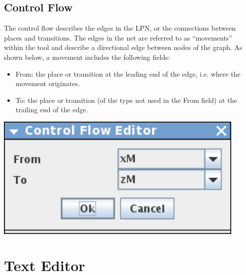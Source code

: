 \documentclass[titlepage,11pt]{article}
\begin{document}
\subsection{\label{controlFlow}Control Flow}

\noindent
The control flow describes the edges in the LPN, or the connections between
places and transitions.  The edges in the net are referred to as ``movements''
within the tool and describe a directional edge between nodes of the graph.
As shown below, a movement includes the following fields:
\begin{itemize}
\item From: the place or transition at the leading end of the edge, i.e. where
       the movement originates.
\item To: the place or transition  (of the type not used in the From field) at
       the trailing end of the edge.
\end{itemize}
\begin{center}
\includegraphics[height=60mm]{screenshots/movement}
\end{center}

\section{\label{TextEdit}Text Editor}
\end{document}
